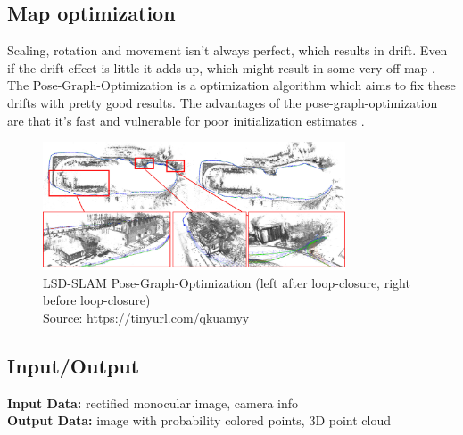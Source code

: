 \subsection{Map optimization}
Scaling, rotation and movement isn't always perfect, which results in drift. Even if the drift effect is little it adds up, which might result in some very off map \cite{lsdslam_eccv}. The Pose-Graph-Optimization is a optimization algorithm which aims to fix these drifts with pretty good results. The advantages of the pose-graph-optimization are that it's fast and vulnerable for poor initialization estimates \cite{posegraphoptimization}. \newline

\begin{figure}[h]
	\centering
	\includegraphics[width=0.8\textwidth]{./media/images/lsd-slam-pose-graph-optimization.jpg}
  	\caption{LSD-SLAM Pose-Graph-Optimization (left after loop-closure, right before loop-closure)
  	\\Source: \url{https://tinyurl.com/qkuamyy}}
  	\label{rosstructure}
\end{figure}

\subsection{Input/Output}
\textbf{Input Data:} rectified monocular image, camera info\\
\textbf{Output Data:} image with probability colored points, 3D point cloud